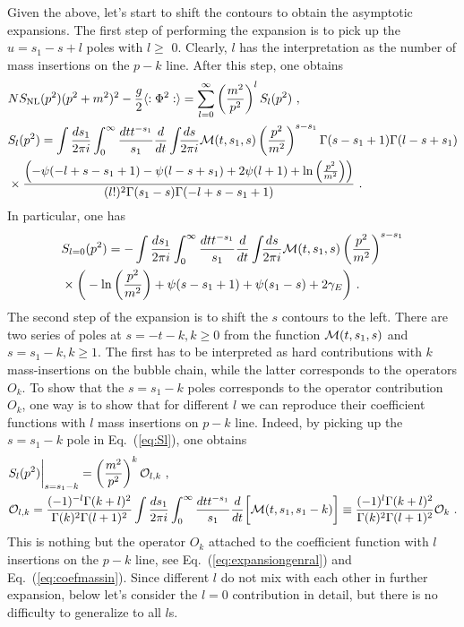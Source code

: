 \documentclass[a4paper,11pt]{article}
\begin{document}
Given the above, let's start to shift the contours to obtain the asymptotic expansions. The first step of performing the expansion is to pick up the $u=s_1-s+l$ poles with $l \ge $ 0. Clearly, $l$ has the interpretation as the number of mass insertions on the $p-k$ line. After this step, one obtains
     \begin{align}
     &NS_{\rm NL}(p^2)(p^2+m^2)^2-\frac{g}{2}\langle :\Phi^2:\rangle=\sum_{l=0}^{\infty}\left(\frac{m^2}{p^2}\right)^lS_l(p^2) \ , \\
     &S_l(p^2)=\int\frac{ds_1}{2\pi i}\int_0^{\infty} \frac{dt t^{-s_1}}{s_1}\frac{d}{dt}\int_{} \frac{ds}{2\pi i} {\cal M}(t,s_1,s) \left(\frac{p^2}{m^2}\right)^{s-s_1}  \Gamma (s-s_1+1)  \Gamma (l-s+s_1) \nonumber \\ 
     &\times \frac{\left(-\psi(-l+s-s_1+1)-\psi(l-s+s_1)+2 \psi(l+1)+\ln \left(\frac{p^2}{m^2}\right)\right)}{(l!)^2 \Gamma (s_1-s) \Gamma (-l+s-s_1+1)} \ . \label{eq:Sl}
     \end{align}
     In particular, one has
     \begin{align}
     &S_{l=0}(p^2)=-\int\frac{ds_1}{2\pi i}\int_0^{\infty} \frac{dt t^{-s_1}}{s_1}\frac{d}{dt}\int_{} \frac{ds}{2\pi i} {\cal M}(t,s_1,s) \left(\frac{p^2}{m^2}\right)^{s-s_1}   \nonumber \\ 
     &\times \bigg(-\ln \left(\frac{p^2}{m^2}\right)+\psi (s-s_1+1)+\psi(s_1-s)+2 \gamma_E\bigg) \ .
     \end{align}
 The second step of the expansion is to shift the $s$ contours to the left. There are two series of poles at $s=-t-k, k\ge 0$ from the function ${\cal M}(t,s_1,s)$ and $s=s_1-k, k\ge 1$. The first has to be interpreted as hard contributions with $k$ mass-insertions on the bubble chain, while the latter corresponds to the operators $O_k$. To show that the $s=s_1-k$ poles corresponds to the operator contribution $O_k$, one way is to show that for different $l$ we can reproduce their coefficient functions with $l$ mass insertions on $p-k$ line. Indeed, by picking up the $s=s_1-k$ pole in Eq.~(\ref{eq:Sl}), one obtains
\begin{align}
&S_l(p^2)\bigg|_{s=s_1-k}=\left(\frac{m^2}{p^2}\right)^k {\cal O}_{l,k} \ , \\
&{\cal O}_{l,k}=\frac{(-1)^{-l} \Gamma (k+l)^2}{\Gamma (k)^2 \Gamma (l+1)^2}\int \frac{ds_1}{2\pi i}\int_0^{\infty} \frac{dt t^{-s_1}}{s_1}\frac{d}{dt}\bigg[{\cal M}(t,s_1,s_1-k)\bigg]\equiv\frac{(-1)^{l} \Gamma (k+l)^2}{\Gamma (k)^2 \Gamma (l+1)^2}{\cal O}_{k} \ .
\end{align}
This is nothing but the operator $O_k$ attached to the 
coefficient function with $l$ insertions on the $p-k$ line, see Eq.~(\ref{eq:expansiongenral}) and Eq.~(\ref{eq:coefmassin}). Since different $l$ do not mix with each other in further expansion, below let's consider the $l=0$ contribution in detail, but there is no difficulty to generalize to all $l$s. 
\end{document}
